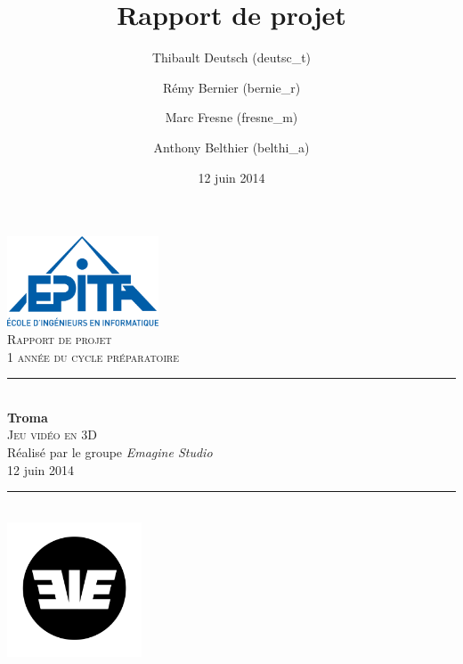 \documentclass[11pt]{report}
\title{Rapport de projet}
\author{Thibault Deutsch (deutsc\_t) \and Rémy Bernier (bernie\_r) \and Marc Fresne (fresne\_m) \and Anthony Belthier (belthi\_a)}
\date{12 juin 2014}
\begin{document}
\renewcommand{\labelitemi}{$\bullet$}

\begin{titlepage}
\newcommand{\HRule}{\rule{\linewidth}{0.5mm}} %

\flushright
\includegraphics[width = 4.5cm]{EPITA.png}\\[0.5cm] %

\textsc{\Large Rapport de projet}\\[0.15cm] %
\textsc{\large 1\ier{} année du cycle préparatoire}\\[3cm] %

\center
\HRule \\[0.5cm]
{\Huge \bfseries Troma}\\[0.3cm] %
\textsc{\Large Jeu vidéo en 3D}\\[0.1cm]
\large Réalisé par le groupe \emph{Emagine Studio}\\[1.5cm]
\large 12 juin 2014\\[0.1cm]
\HRule \\[2cm]

\includegraphics[width = 4cm]{eie.png}\\[1cm]


\end{titlepage}
\end{document}

